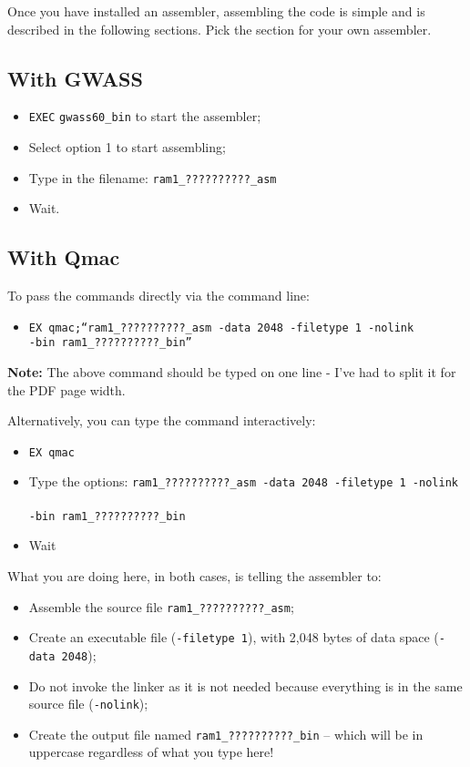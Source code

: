 Once you have installed an assembler, assembling the code is simple
and is described in the following sections. Pick the section for your
own assembler.

\subsection{With GWASS}
\begin{itemize}
\item \texttt{EXEC} \texttt{gwass60\_bin} to start the assembler;
\item Select option 1 to start assembling;
\item Type in the filename: \texttt{ram1\_??????????\_asm}
\item Wait.
\end{itemize}

\subsection{With Qmac}

To pass the commands directly via the command line:
\begin{itemize}
\item \texttt{EX qmac;``ram1\_??????????\_asm -data 2048 -filetype 1 -nolink
}~\\
\texttt{-bin ram1\_??????????\_bin''}
\end{itemize}
\textbf{Note:} The above command should be typed on one line - I've
had to split it for the PDF page width. 

Alternatively, you can type the command interactively:
\begin{itemize}
\item \texttt{EX qmac}
\item Type the options: \texttt{ram1\_??????????\_asm -data 2048 -filetype
1 -nolink }~\\
\texttt{-bin ram1\_??????????\_bin}
\item Wait
\end{itemize}
What you are doing here, in both cases, is telling the assembler to:
\begin{itemize}
\item Assemble the source file \texttt{ram1\_??????????\_asm};
\item Create an executable file (\texttt{-filetype 1}), with 2,048 bytes
of data space (\texttt{-data 2048});
\item Do not invoke the linker as it is not needed because everything is
in the same source file (\texttt{-nolink});
\item Create the output file named \texttt{ram1\_??????????\_bin} -- which
will be in uppercase regardless of what you type here!
\end{itemize}

